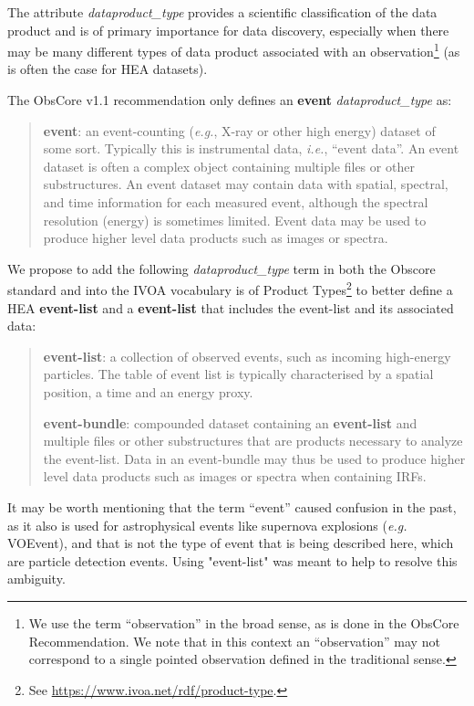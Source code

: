 \documentclass[11pt,a4paper]{ivoa}
\begin{document}
The attribute {\em dataproduct\_type\/} provides a scientific classification of the data product and is of primary importance for data discovery, especially when there may be many different types of data product associated with an observation\footnote{We use the term ``observation'' in the broad sense, as is done in the ObsCore Recommendation. We note that in this context an ``observation'' may not correspond to a single pointed observation defined in the traditional sense.} (as is often the case for \gls{HEA} datasets).

The ObsCore v1.1 recommendation \citep{2017ivoa.spec.0509L} only defines an {\bf event} {\em dataproduct\_type} as:

\begin{quote}
{\bf event}: an event-counting ({\em e.g.\/}, X-ray or other high energy) dataset of some sort. Typically this is instrumental data, {\em i.e.\/}, ``event data''.  An event dataset is often a complex object containing multiple files or other substructures. An event dataset may contain data with spatial, spectral, and time information for each measured event, although the spectral resolution (energy) is sometimes limited. Event data may be used to produce higher level data products such as images or spectra.
\end{quote}

We propose to add the following {\em dataproduct\_type} term in both the Obscore standard and into the \gls{IVOA} vocabulary is of Product Types\footnote{See \url{https://www.ivoa.net/rdf/product-type}.} to better define a \gls{HEA} \textbf{event-list} and a  \textbf{event-list} that includes the event-list and its associated data:

\begin{quote}
{\bf event-list}: a collection of observed events, such as incoming high-energy particles. The table of event list is typically characterised by a spatial position, a time and an energy proxy. 

{\bf event-bundle}: compounded dataset containing an {\bf event-list} and multiple files or other substructures that are products necessary to analyze the event-list. Data in an event-bundle may thus be used to produce higher level data products such as images or spectra when containing \glspl{IRF}.
\end{quote}

It may be worth mentioning that the term ``event'' caused confusion in the past, as it also is used for astrophysical events like supernova explosions ({\em e.g.\/} VOEvent), and that is not the type of event that is being described here, which are particle detection events. Using "event-list" was meant to help to resolve this ambiguity.
\end{document}
